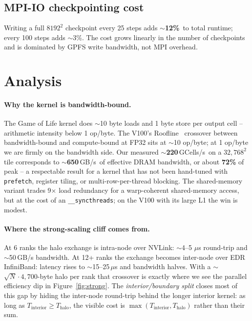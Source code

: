\documentclass[sigconf,nonacm,10pt]{acmart}
\begin{document}
\subsection{MPI-IO checkpointing cost}

Writing a full $8192^{2}$ checkpoint every 25 steps adds
$\sim$\textbf{12\%}\,%
to total runtime; every 100 steps adds $\sim$3\%. The cost grows
linearly in the number of checkpoints and is dominated by GPFS
write bandwidth, not MPI overhead.

\section{Analysis}\label{sec:analysis}

\paragraph{Why the kernel is bandwidth-bound.}
The Game of Life kernel does $\sim$10 byte loads and 1 byte store per
output cell -- arithmetic intensity below 1 op/byte. The V100's
Roofline~\cite{williams2009roofline} crossover between
bandwidth-bound and compute-bound at FP32 sits at $\sim$10 op/byte; at
1 op/byte we are firmly on the bandwidth side. Our measured
$\sim$\textbf{220}\,GCells/s\,%
on a $32{,}768^{2}$ tile corresponds to
$\sim$\textbf{650}\,GB/s\,%
of effective DRAM bandwidth, or about \textbf{72\%} of peak -- a
respectable result for a kernel that has not been hand-tuned with
\texttt{prefetch}, register tiling, or multi-row-per-thread blocking.
The shared-memory variant trades 9$\times$ load redundancy for a
warp-coherent shared-memory access, but at the cost of an
\texttt{\_\_syncthreads}; on the V100 with its large L1 the win is
modest.

\paragraph{Where the strong-scaling cliff comes from.}
At 6 ranks the halo exchange is intra-node over NVLink: $\sim$4--5
$\mu$s round-trip and $\sim$50\,GB/s bandwidth. At 12+ ranks the
exchange becomes inter-node over EDR InfiniBand: latency rises to
$\sim$15--25\,$\mu$s and bandwidth halves. With a $\sim$$\sqrt{N}\cdot
4{,}700$-byte halo per rank that crossover is exactly where we see
the parallel efficiency dip in Figure~\ref{fig:strong}. The
\emph{interior/boundary split} closes most of this gap by hiding the
inter-node round-trip behind the longer interior kernel: as long as
$T_{\text{interior}} \ge T_{\text{halo}}$, the visible cost is
$\max(T_{\text{interior}}, T_{\text{halo}})$ rather than their sum.
\end{document}
